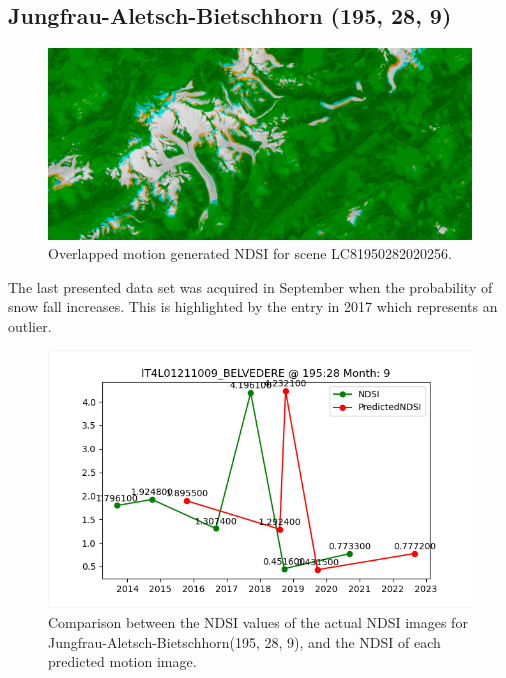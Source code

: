 \documentclass[12pt, a4paper]{report}
\begin{document}
	
	\newpage{}
	
	\subsection{Jungfrau-Aletsch-Bietschhorn (195, 28, 9)}
	
	\begin{figure}[h!]
		\centering
		\includegraphics[width=\linewidth]{../images/experiment_1950289.png}
		\caption{Overlapped motion generated NDSI for scene LC81950282020256.}
		\label{fig:experiment_1950289_image}
	\end{figure}

	The last presented data set was acquired in September when the probability of snow fall increases. This is highlighted by the entry in 2017 which represents an outlier.
	
	\begin{figure}[h!]
		\centering
		\includegraphics[scale=0.5]{../images/experiment_195289.png}
		\caption{Comparison between the NDSI values of the actual NDSI images for Jungfrau-Aletsch-Bietschhorn(195, 28, 9), and the NDSI of each predicted motion image.}
		\label{fig:jungfrau_195289}
	\end{figure}
	
\end{document}
